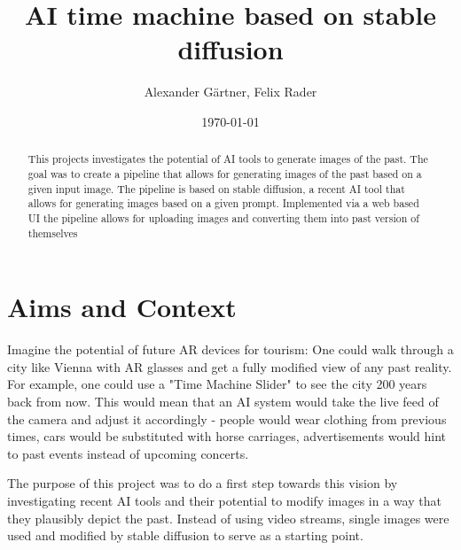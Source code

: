 \documentclass[english,notitlepage,smartquotes]{hgbreport}
\begin{document}

\author{Alexander Gärtner, Felix Rader}                    
\title{ AI time machine based on stable diffusion }	                 
\date{\today}

\maketitle

\begin{abstract}\noindent
	This projects investigates the potential of AI tools to generate images of the past. The goal was to create a pipeline that allows for generating images of the past based on a given input image. The pipeline is based on stable diffusion, a recent AI tool that allows for generating images based on a given prompt. Implemented via a web based UI the pipeline allows for uploading images and converting them into past version of themselves 
\end{abstract}

\tableofcontents

\chapter{Aims and Context}

Imagine the potential of future AR devices for tourism: One could walk through a city like Vienna with AR glasses and get a fully modified view of any past reality. For example, one could use a "Time Machine Slider" to see the city 200 years back from now. This would mean that an AI system would take the live feed of the camera and adjust it accordingly - people would wear clothing from previous times, cars would be substituted with horse carriages, advertisements would hint to past events instead of upcoming concerts.  

The purpose of this project was to do a first step towards this vision by investigating recent AI tools and their potential to modify images in a way that they plausibly depict the past. Instead of using video streams,  single images were used and modified by stable diffusion to serve as a starting point.
\end{document}
